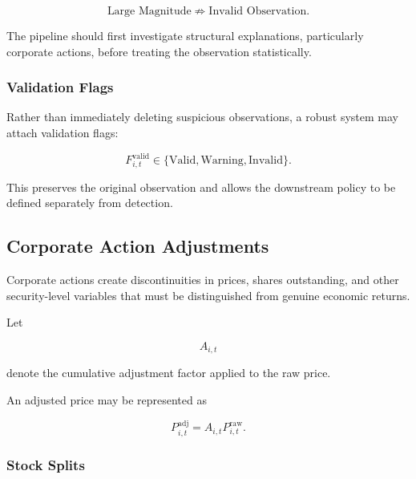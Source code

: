 \documentclass[11pt,a4paper]{article}
\begin{document}
\begin{equation}
\boxed{
\text{Large Magnitude}
\not\Rightarrow
\text{Invalid Observation}.
}
\end{equation}

The pipeline should first investigate structural explanations, particularly
corporate actions, before treating the observation statistically.


\subsubsection{Validation Flags}

Rather than immediately deleting suspicious observations, a robust system may
attach validation flags:

\begin{equation}
F_{i,t}^{\mathrm{valid}}
\in
\{
\mathrm{Valid},
\mathrm{Warning},
\mathrm{Invalid}
\}.
\end{equation}

This preserves the original observation and allows the downstream policy to be
defined separately from detection.


\subsection{Corporate Action Adjustments}
\label{subsec:corporate_action_adjustments}

Corporate actions create discontinuities in prices, shares outstanding, and
other security-level variables that must be distinguished from genuine economic
returns.

Let

\begin{equation}
A_{i,t}
\end{equation}

denote the cumulative adjustment factor applied to the raw price.

An adjusted price may be represented as

\begin{equation}
\boxed{
P_{i,t}^{\mathrm{adj}}
=
A_{i,t}
P_{i,t}^{\mathrm{raw}}.
}
\end{equation}


\subsubsection{Stock Splits}
\end{document}
